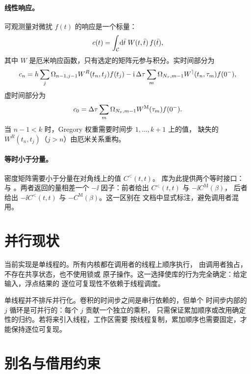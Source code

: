 \paragraph{线性响应。}
可观测量对微扰 $f(t)$ 的响应是一个标量：
\begin{equation}
    c(t) = \int_{\mathcal{C}}\!\mathrm{d}\bar t\;W(t,\bar t)\,f(\bar t),
\end{equation}
其中 $W$ 是厄米响应函数，只有选定的矩阵元参与积分。实时间部分为
\begin{equation}
    c_n = h\sum_{j}\Omega_{n-1,j-1}W^{R}(t_n,t_j)f(t_j)
        -\mathrm{i}\,\Delta\tau\sum_{m}\Omega_{N_\tau,m-1}
        W^{\rceil}(t_n,\tau_m)f(0^-),
\end{equation}
虚时间部分为
\begin{equation}
    c_0 = \Delta\tau\sum_{m}\Omega_{N_\tau,m-1}
        W^{\mathrm{M}}(\tau_m)f(0^-).
\end{equation}
当 $n-1<k$ 时，Gregory 权重需要时间步 $1,\dots,k+1$ 上的值，
缺失的 $W^{R}(t_n,t_j)$（$j>n$）由厄米关系重构。

\paragraph{等时小于分量。}
密度矩阵需要小于分量在对角线上的值 $C^{<}(t,t)$。
库为此提供两个等时接口：
 与
。两者返回的量相差一个
$-\ii$ 因子：前者给出 $C^{<}(t,t)$ 与 $-\ii C^{\mathrm{M}}(\beta)$，
后者给出 $-\ii C^{<}(t,t)$ 与 $-C^{\mathrm{M}}(\beta)$。这一区别在
文档中显式标注，避免调用者混用。

\section{并行现状}
\label{sec:parallel}

当前实现是单线程的。所有内核都在调用者的线程上顺序执行，
 由调用者独占，不存在共享状态，也不使用锁或
原子操作。这一选择使库的行为完全确定：给定输入，浮点结果的
逐位可复现性不依赖于线程调度。

单线程并不排斥并行化。卷积的时间步之间是串行依赖的，但单个
时间步内部的 $j$ 循环是可并行的：每个 $j$ 贡献一个独立的乘积，
只需保证累加顺序或改用确定性的归约。若将来引入线程，工作区需要
按线程复制，累加顺序也需要固定，才能保持逐位可复现。

\section{别名与借用约束}
\label{sec:alias}

